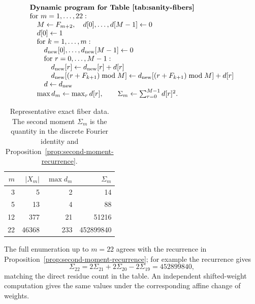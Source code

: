 \[
\begin{array}{l}
\text{\bf Dynamic program for Table~\ref{tab:sanity-fibers}}\\
\text{for }m=1,\ldots,22:\\
\quad M\leftarrow F_{m+2},\quad d[0],\ldots,d[M-1]\leftarrow0\\
\quad d[0]\leftarrow1\\
\quad \text{for }k=1,\ldots,m:\\
\quad\quad d_{\rm new}[0],\ldots,d_{\rm new}[M-1]\leftarrow0\\
\quad\quad \text{for }r=0,\ldots,M-1:\\
\quad\quad\quad d_{\rm new}[r]\leftarrow d_{\rm new}[r]+d[r]\\
\quad\quad\quad d_{\rm new}[(r+F_{k+1})\bmod M]
\leftarrow d_{\rm new}[(r+F_{k+1})\bmod M]+d[r]\\
\quad\quad d\leftarrow d_{\rm new}\\
\quad \max d_m\leftarrow \max_r d[r],\qquad
\Sigma_m\leftarrow\sum_{r=0}^{M-1}d[r]^2 .
\end{array}
\]

\begin{table}[t]
\centering
\caption{Representative exact fiber data. The second moment $\Sigma_m$ is the quantity in the discrete Fourier identity and Proposition~\ref{prop:second-moment-recurrence}.}
\label{tab:sanity-fibers}
\renewcommand{\arraystretch}{1.15}
\begin{tabular}{rrrr}
\toprule
$m$ & $|X_m|$ & $\max d_m$ & $\Sigma_m$ \\
\midrule
3 & 5 & 2 & 14 \\
5 & 13 & 4 & 88 \\
12 & 377 & 21 & 51216 \\
22 & 46368 & 233 & 452899840 \\
\bottomrule
\end{tabular}
\end{table}

The full enumeration up to $m=22$ agrees with the recurrence in Proposition~\ref{prop:second-moment-recurrence}; for example the recurrence gives
\[
\Sigma_{22}=2\Sigma_{21}+2\Sigma_{20}-2\Sigma_{19}=452899840,
\]
matching the direct residue count in the table. An independent shifted-weight
computation gives the same values under the corresponding affine change of
weights.
